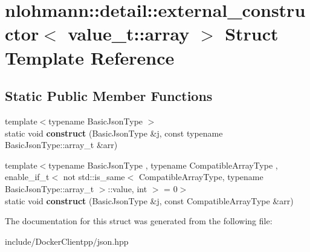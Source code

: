 \hypertarget{structnlohmann_1_1detail_1_1external__constructor_3_01value__t_1_1array_01_4}{}\section{nlohmann\+::detail\+::external\+\_\+constructor$<$ value\+\_\+t\+::array $>$ Struct Template Reference}
\label{structnlohmann_1_1detail_1_1external__constructor_3_01value__t_1_1array_01_4}
\subsection*{Static Public Member Functions}
\begin{DoxyCompactItemize}
\item 
\mbox{\label{structnlohmann_1_1detail_1_1external__constructor_3_01value__t_1_1array_01_4_abfb2a6eec0bc21e8a7438546aebc55d8}} 
{\footnotesize template$<$typename Basic\+Json\+Type $>$ }\\static void {\bfseries construct} (Basic\+Json\+Type \&j, const typename Basic\+Json\+Type\+::array\+\_\+t \&arr)
\item 
\mbox{\label{structnlohmann_1_1detail_1_1external__constructor_3_01value__t_1_1array_01_4_a110f50fd5378da876d9a6d6a8d945e37}} 
{\footnotesize template$<$typename Basic\+Json\+Type , typename Compatible\+Array\+Type , enable\+\_\+if\+\_\+t$<$ not std\+::is\+\_\+same$<$ Compatible\+Array\+Type, typename Basic\+Json\+Type\+::array\+\_\+t $>$\+::value, int $>$  = 0$>$ }\\static void {\bfseries construct} (Basic\+Json\+Type \&j, const Compatible\+Array\+Type \&arr)
\end{DoxyCompactItemize}


The documentation for this struct was generated from the following file\+:\begin{DoxyCompactItemize}
\item 
include/\+Docker\+Clientpp/json.\+hpp\end{DoxyCompactItemize}
